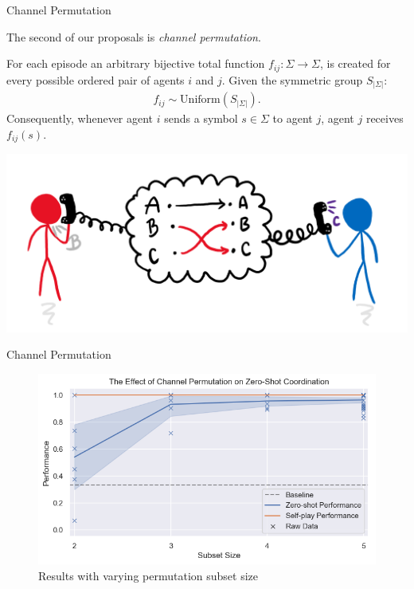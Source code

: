 \begin{frame}{Channel Permutation}

    
    The second of our proposals is \textit{channel permutation}.
    
    For each episode an arbitrary bijective total function $f_{ij}: \Sigma \rightarrow \Sigma$, is created for every possible ordered pair of agents $i$ and $j$. Given the symmetric group $S_{|\Sigma|}$:
    \begin{align}
        f_{ij} \sim \text{Uniform}(S_{|\Sigma|}).   
    \end{align}
    Consequently, whenever agent $i$ sends a symbol $s \in \Sigma$ to agent $j$, agent $j$ receives $f_{ij}(s)$.
    
    \begin{center}
        \includegraphics[width=0.8\linewidth]{figures/chan_perm_cartoon.png}
    \end{center}

\end{frame}

\begin{frame}{Channel Permutation}
    
    \begin{figure}
        \centering
        \includegraphics[width=1\linewidth]{figures/permutation_subset_and_zs_coordination.png}
        \caption{Results with varying permutation subset size}
        \label{fig:arch_diagram}
    \end{figure}
    
\end{frame}

